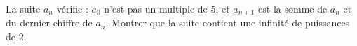 La suite $a_n$ vérifie : $a_0$ n'est pas un multiple de $5$, et $a_{n+1}$ est la somme de $a_n$ et du dernier chiffre de $a_n$. Montrer que la suite contient une infinité de puissances de $2$.
